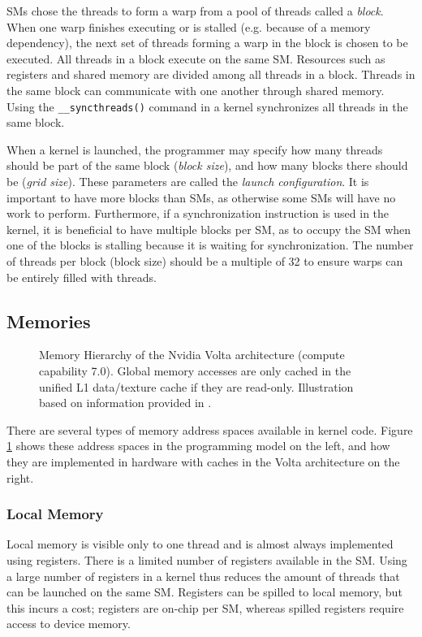 SMs chose the threads to form a warp from a pool of threads called a \emph{block}. When one warp finishes executing or is stalled (e.g. because of a memory dependency), the next set of threads forming a warp in the block is chosen to be executed. All threads in a block execute on the same SM. Resources such as registers and shared memory are divided among all threads in a block. Threads in the same block can communicate with one another through shared memory. Using the \texttt{\_\_syncthreads()} command in a kernel synchronizes all threads in the same block.

When a kernel is launched, the programmer may specify how many threads should be part of the same block (\emph{block size}), and how many blocks there should be (\emph{grid size}). These parameters are called the \emph{launch configuration}. It is important to have more blocks than SMs, as otherwise some SMs will have no work to perform. Furthermore, if a synchronization instruction is used in the kernel, it is beneficial to have multiple blocks per SM, as to occupy the SM when one of the blocks is stalling because it is waiting for synchronization. The number of threads per block (block size) should be a multiple of 32 to ensure warps can be entirely filled with threads. \cite[Section~10]{cuda-best-practices}

\subsection{Memories} \label{sec:memories}

\begin{figure}
	\makebox[\textwidth]{
	}
	\caption{\label{fig:memory-hierarchy} Memory Hierarchy of the Nvidia Volta architecture (compute capability 7.0). Global memory accesses are only cached in the unified L1 data/texture cache if they are read-only. Illustration based on information provided in \cite[Sections 2.3, 5.3.2, H.6]{cuda-programming}.}
\end{figure}

There are several types of memory address spaces available in kernel code. Figure \ref{fig:memory-hierarchy} shows these address spaces in the programming model on the left, and how they are implemented in hardware with caches in the Volta architecture on the right. 

\subsubsection{Local Memory}
Local memory is visible only to one thread and is almost always implemented using registers. There is a limited number of registers available in the SM. Using a large number of registers in a kernel thus reduces the amount of threads that can be launched on the same SM. Registers can be spilled to local memory, but this incurs a cost; registers are on-chip per SM, whereas spilled registers require access to device memory.

